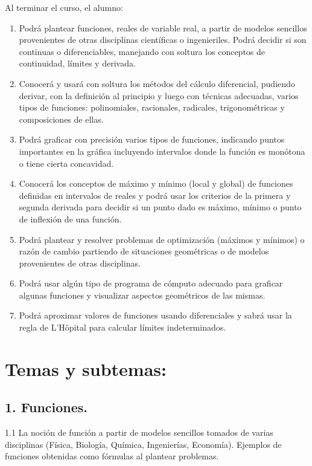 \documentclass[]{book}
\begin{document}
Al terminar el curso, el alumno:

\begin{enumerate}
\def\labelenumi{\arabic{enumi}.}
\item
  Podrá plantear funciones, reales de variable real, a partir de modelos
  sencillos provenientes de otras disciplinas científicas o
  ingenieriles. Podrá decidir si son continuas o diferenciables,
  manejando con soltura los conceptos de continuidad, límites y
  derivada.
\item
  Conocerá y usará con soltura los métodos del cálculo diferencial,
  pudiendo derivar, con la definición al principio y luego con técnicas
  adecuadas, varios tipos de funciones: polinomiales, racionales,
  radicales, trigonométricas y composiciones de ellas.
\item
  Podrá graficar con precisión varios tipos de funciones, indicando
  puntos importantes en la gráfica incluyendo intervalos donde la
  función es monótona o tiene cierta concavidad.
\item
  Conocerá los conceptos de máximo y mínimo (local y global) de
  funciones definidas en intervalos de reales y podrá usar los criterios
  de la primera y segunda derivada para decidir si un punto dado es
  máximo, mínimo o punto de inflexión de una función.
\item
  Podrá plantear y resolver problemas de optimización (máximos y
  mínimos) o razón de cambio partiendo de situaciones geométricas o de
  modelos provenientes de otras disciplinas.
\item
  Podrá usar algún tipo de programa de cómputo adecuado para graficar
  algunas funciones y visualizar aspectos geométricos de las mismas.
\item
  Podrá aproximar valores de funciones usando diferenciales y sabrá usar
  la regla de L'Hôpital para calcular límites indeterminados.
\end{enumerate}

\section*{Temas y subtemas: }

\subsection*{1. Funciones. }

1.1 La noción de función a partir de modelos sencillos tomados de varias
disciplinas (Física, Biología, Química, Ingenierías, Economía). Ejemplos
de funciones obtenidas como fórmulas al plantear problemas.
\end{document}
